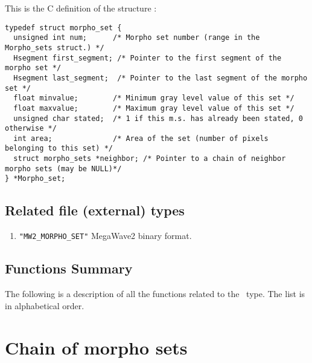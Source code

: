 This is the C definition of the structure \mset:
{\small
\begin{verbatim}
typedef struct morpho_set {
  unsigned int num;      /* Morpho set number (range in the Morpho_sets struct.) */
  Hsegment first_segment; /* Pointer to the first segment of the morpho set */
  Hsegment last_segment;  /* Pointer to the last segment of the morpho set */  
  float minvalue;        /* Minimum gray level value of this set */
  float maxvalue;        /* Maximum gray level value of this set */
  unsigned char stated;  /* 1 if this m.s. has already been stated, 0 otherwise */
  int area;              /* Area of the set (number of pixels belonging to this set) */
  struct morpho_sets *neighbor; /* Pointer to a chain of neighbor morpho sets (may be NULL)*/
} *Morpho_set;
\end{verbatim}
}

\subsection{Related file (external) types}
\label{mset-file_type}

\begin{enumerate}
\item \verb+"MW2_MORPHO_SET"+ MegaWave2 binary format.
\end{enumerate}

\subsection{Functions Summary}
\label{mset-function}

The following is a description of all the functions related to 
the \mset\ type. The list is in alphabetical order.

\newpage %



\section{Chain of morpho sets}


\label{morpho_sets}
\def\msets{{\tt Morpho\_sets}}
\def\mimage{{\tt Mimage}}


